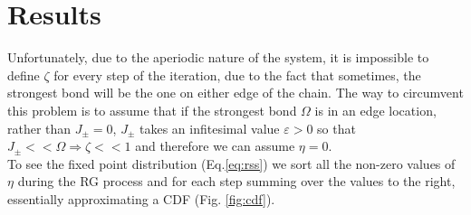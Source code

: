 \documentclass[../numerical,../../main.tex]{subfiles}
\begin{document}
\section{Results}
Unfortunately, due to the aperiodic nature of the system, it is impossible to define $\zeta$ for every step of the iteration, due to the fact that sometimes, the strongest bond will be the one on either edge of the chain. The way to circumvent this problem is to assume that if the strongest bond $\Omega$ is in an edge location, rather than $J_{\pm}=0$, $J_{\pm}$ takes an infitesimal value $\varepsilon > 0$ so that $J_{\pm}<<\Omega \Rightarrow \zeta << 1$ and therefore we can assume $\eta = 0$.\\

To see the fixed point distribution (Eq.\ref{eq:rss}) we sort all the non-zero values of $\eta$ during the RG process and for each step summing over the values to the right, essentially approximating a CDF (Fig. \ref{fig:cdf}).
\end{document}
